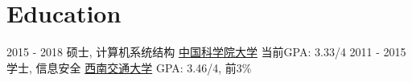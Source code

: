 \documentclass[a4paper]{twentysecondcv} %
\begin{document}
\section{Education}

\begin{twenty} %
	\twentyitem
	{2015 - 2018}
	{硕士, 计算机系统结构}
	{\href{http://english.cas.cn/}{中国科学院大学}}
	{}
	{当前GPA: 3.33/4}
	\twentyitem
	{2011 - 2015}
	{学士, 信息安全}
	{\href{http://english.swjtu.edu.cn/}{西南交通大学}}
	{}
	{GPA: 3.46/4, 前3\%}
\end{twenty}
\end{document}
